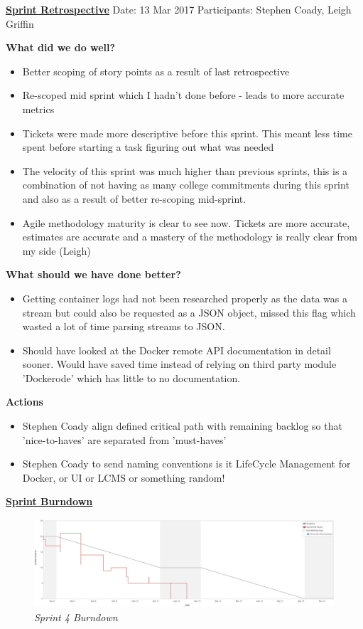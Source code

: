 \underline{\textbf{Sprint Retrospective}}\newline
Date: 13 Mar 2017
Participants: Stephen Coady, Leigh Griffin

\textbf{What did we do well?}
\begin{itemize}
	\item Better scoping of story points as a result of last retrospective
	\item Re-scoped mid sprint which I hadn't done before - leads to more accurate metrics
	\item Tickets were made more descriptive before this sprint. This meant less time spent before starting a task figuring out what was needed
	\item The velocity of this sprint was much higher than previous sprints, this is a combination of not having as many college commitments during this sprint and also as a result of better re-scoping mid-sprint.
	\item Agile methodology maturity is clear to see now. Tickets are more accurate, estimates are accurate and a mastery of the methodology is really clear from my side (Leigh)
\end{itemize}
\textbf{What should we have done better?}
\begin{itemize}
	\item Getting container logs had not been researched properly as the data was a stream but could also be requested as a JSON object, missed this flag which wasted a lot of time parsing streams to JSON.
	\item Should have looked at the Docker remote API documentation in detail sooner. Would have saved time instead of relying on third party module 'Dockerode' which has little to no documentation.
\end{itemize}

\textbf{Actions}
\begin{itemize}
	\item Stephen Coady align defined critical path with remaining backlog so that 'nice-to-haves' are separated from 'must-haves'
	\item Stephen Coady to send naming conventions is it LifeCycle Management for Docker, or UI or LCMS or something random!
\end{itemize}

\underline{\textbf{Sprint Burndown}}\newline
\begin{figure}[!ht]
\centering
\includegraphics*[width=\textwidth]{images/sprint4}
\caption{\em Sprint 4 Burndown}
\label{fig:sprint4}
\end{figure}

